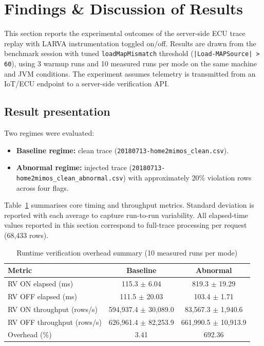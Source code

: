 \section{Findings \& Discussion of Results}
\label{sec:Fin}

This section reports the experimental outcomes of the server-side ECU trace replay with LARVA instrumentation toggled on/off. Results are drawn from the benchmark session with tuned \texttt{loadMapMismatch} threshold (\texttt{|Load-MAPSource| > 60}), using 3 warmup runs and 10 measured runs per mode on the same machine and JVM conditions. The experiment assumes telemetry is transmitted from an IoT/ECU endpoint to a server-side verification API.

\subsection{Result presentation}

Two regimes were evaluated:
\begin{itemize}
    \item \textbf{Baseline regime:} clean trace (\texttt{20180713-home2mimos\_clean.csv}).
    \item \textbf{Abnormal regime:} injected trace (\texttt{20180713-home2mimos\_clean\_abnormal.csv}) with approximately 20\% violation rows across four flags.
\end{itemize}

Table~\ref{tab:rv-overhead} summarises core timing and throughput metrics. Standard deviation is reported with each average to capture run-to-run variability.
All elapsed-time values reported in this section correspond to full-trace processing per request (68{,}433 rows).

\begin{table}[ht]
    \centering
    \caption{Runtime verification overhead summary (10 measured runs per mode)}
    \label{tab:rv-overhead}
    \begin{tabular}{l|c|c}
    \textbf{Metric} & \textbf{Baseline} & \textbf{Abnormal} \\ \hline
    RV ON elapsed (ms) & 115.3 $\pm$ 6.04 & 819.3 $\pm$ 19.29 \\
    RV OFF elapsed (ms) & 111.5 $\pm$ 20.03 & 103.4 $\pm$ 1.71 \\
    RV ON throughput (rows/s) & 594{,}937.4 $\pm$ 30{,}089.0 & 83{,}567.3 $\pm$ 1{,}940.6 \\
    RV OFF throughput (rows/s) & 626{,}961.4 $\pm$ 82{,}253.9 & 661{,}990.5 $\pm$ 10{,}913.9 \\
    Overhead (\%) & 3.41 & 692.36 \\
    \end{tabular}
\end{table}

